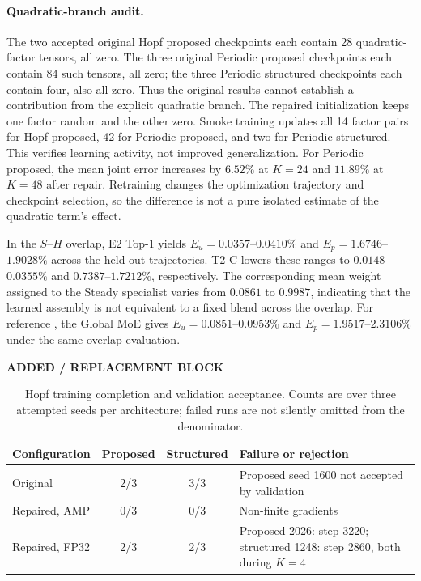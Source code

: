 \documentclass{article}
\providecommand{\DIFaddtex}[1]{{\protect\color{blue} \sf #1}} %
\providecommand{\DIFdeltex}[1]{{\protect\color{red} \scriptsize #1}} %
\providecommand{\DIFaddbegin}{} %
\providecommand{\DIFaddend}{} %
\providecommand{\DIFdelbegin}{} %
\providecommand{\DIFdelend}{} %
\providecommand{\DIFadd}[1]{\texorpdfstring{\DIFaddtex{#1}}{#1}} %
\providecommand{\DIFdel}[1]{\texorpdfstring{\DIFdeltex{#1}}{}} %
\begin{document}
\DIFdelbegin %
\DIFdelend \DIFaddbegin \paragraph{\DIFadd{Quadratic-branch audit.}}
\DIFadd{The two accepted original Hopf proposed checkpoints each contain 28
quadratic-factor tensors, all zero. The three original Periodic
proposed checkpoints each contain 84 such tensors, all zero; the three
Periodic structured checkpoints each contain four, also all zero.
Thus the original results cannot establish a contribution from the
explicit quadratic branch. The repaired initialization keeps one factor
random and the other zero. Smoke training updates all 14 factor pairs
for Hopf proposed, 42 for Periodic proposed, and two for Periodic
structured. This verifies learning activity, not improved generalization.
For Periodic proposed, the mean joint error increases by $6.52\%$ at
$K=24$ and $11.89\%$ at $K=48$ after repair. Retraining changes the
optimization trajectory and checkpoint selection, so the difference is
not a pure isolated estimate of the quadratic term's effect.
}\DIFaddend 



\DIFdelbegin \DIFdel{In the $S$--$H$ overlap, E2 Top-1 yields $E_u=0.0357$--$0.0410\%$ and $E_p=1.6746$--$1.9028\%$ across the held-out trajectories. T2-C lowers these ranges to $0.0148$--$0.0355\%$ and $0.7387$--$1.7212\%$, respectively. The corresponding mean weight assigned to the Steady specialist varies from $0.0861$ to $0.9987$, indicating that the learned assembly is
not equivalent to a fixed blend across the overlap. For reference , the Global MoE gives $E_u=0.0851$--$0.0953\%$ and
$E_p=1.9517$--$2.3106\%$ under the same overlap evaluation. }\DIFdelend \DIFaddbegin 
{\color{blue}
\begin{table}[H]
\color{blue}\noindent\textbf{ADDED / REPLACEMENT BLOCK}\par
\centering
\caption{Hopf training completion and validation acceptance.
Counts are over three attempted seeds per architecture; failed runs
are not silently omitted from the denominator.}
\label{tab:hopf_completion}
\small
\begin{tabular}{@{}lccp{5.8cm}@{}}
\toprule
Configuration & Proposed & Structured & Failure or rejection\\
\midrule
Original & 2/3 & 3/3 & Proposed seed 1600 not accepted by validation\\
Repaired, AMP & 0/3 & 0/3 & Non-finite gradients\\
Repaired, FP32 & 2/3 & 2/3 & Proposed 2026: step 3220; structured 1248:
step 2860, both during $K=4$\\
\bottomrule
\end{tabular}
\end{table}
}
\DIFaddend 
\end{document}
